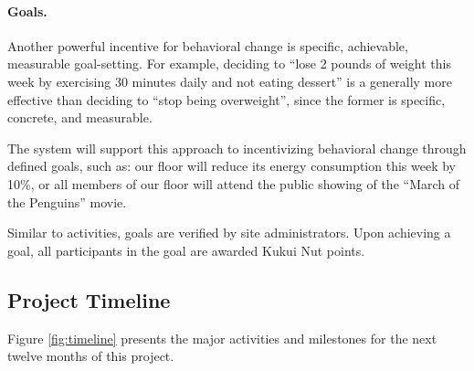 \documentclass[11pt]{article}
\begin{document}
\paragraph{Goals.}  Another powerful incentive
for behavioral change is specific, achievable, measurable goal-setting.
For example, deciding to ``lose 2 pounds of weight this week by exercising
30 minutes daily and not eating dessert'' is a generally more effective
than deciding to ``stop being overweight'', since the former is specific,
concrete, and measurable.  

The system will support this approach to incentivizing behavioral change
through defined goals, such as: our floor will reduce its energy
consumption this week by 10\%, or all members of our floor will attend the
public showing of the ``March of the Penguins'' movie.  

Similar to activities, goals are verified by site administrators.  Upon
achieving a goal, all participants in the goal are awarded Kukui Nut
points.  


\subsection{Project Timeline}

Figure \ref{fig:timeline} presents the major activities and milestones  for the next twelve months of this project.
\end{document}

